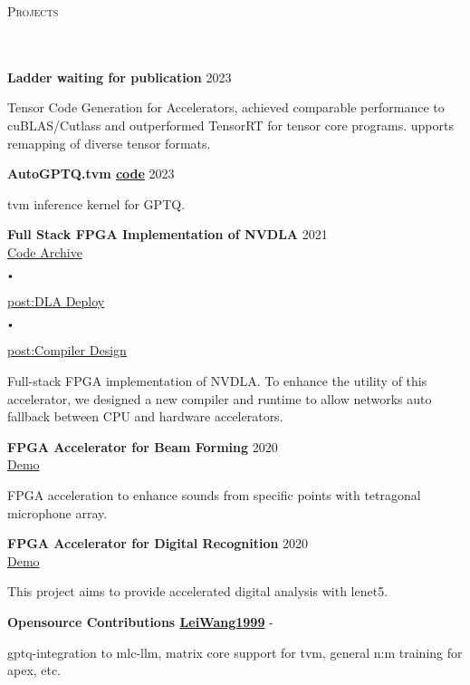\documentclass{article}
\newcommand{\header}[1]{{
\hspace*{-15pt}\vspace*{6pt} \textsc{#1}} \vspace*{-6pt} 
\lineunder
}
\newcommand{\lineunder}{
\vspace*{-8pt} \\ \hspace*{-18pt} 
\hrulefill \\
}
\newcommand{\project}[3]{{
\vspace*{2pt}%
\textbf{#1} \hfill #2\\ #3 \vspace*{2pt}}
}
\renewcommand{\labelitemi}{
$\vcenter{\hbox{\tiny$\bullet$}}$\hspace*{3pt}
}
\renewcommand{\labelitemii}{
$\vcenter{\hbox{\tiny$\bullet$}}$\hspace*{-3pt}
}
\newcommand{\myhref}[2]{%
\href{#1}{\textcolor{ColorTwo}{#2}}
}
\newenvironment{bullet-list-minor}{
\begin{list}{\labelitemii}{\setlength\leftmargin{15pt} 
\topsep 0pt \itemsep -2pt}}{\vspace*{4pt}\end{list}
}
\begin{document}
\vspace*{4pt}%
\header{Projects}
    \project{Ladder \textcolor{ColorOne}
{waiting for publication}}{2023}{}
    \begin{bullet-list-minor}
	\item Tensor Code Generation for Accelerators, achieved comparable performance to cuBLAS/Cutlass and outperformed TensorRT for tensor core programs. upports remapping of diverse tensor formats.
    \end{bullet-list-minor}
    \project{AutoGPTQ.tvm     \textcolor{ColorTwo}{\faGithub} 
\myhref{https://github.com/LeiWang1999/AutoGPTQ.tvm}{code}}{2023}{}
    \begin{bullet-list-minor}
	\item tvm inference kernel for GPTQ.
    \end{bullet-list-minor}
    \project{Full Stack FPGA Implementation of NVDLA}{2021}{
    \textcolor{ColorTwo}{\faGithub} 
\myhref{https://github.com/LeiWang1999/ZYNQ-NVDLA}{Code Archive}
    \labelitemi
    \textcolor{ColorTwo}{\faBook} 
\myhref{https://zhuanlan.zhihu.com/p/378202360}{post:DLA Deploy}
    \labelitemi
        \textcolor{ColorTwo}{\faBook} 
    \myhref{https://zhuanlan.zhihu.com/p/401943271}{post:Compiler Design}
}
	\begin{bullet-list-minor}
	\item Full-stack FPGA implementation of NVDLA. To enhance the utility of this accelerator, we designed a new compiler and runtime to allow networks auto fallback between CPU and hardware
                accelerators.
    \end{bullet-list-minor}
    \project{FPGA Accelerator for Beam Forming}{2020}{
    \textcolor{ColorTwo}{\faVideoCamera} 
    \myhref{https://github.com/LeiWang1999}{Demo}
}
	\begin{bullet-list-minor}
	\item FPGA acceleration to enhance sounds from specific points with tetragonal microphone array.
    \end{bullet-list-minor}
    \project{FPGA Accelerator for Digital Recognition}{2020}{
    \textcolor{ColorTwo}{\faVideoCamera} 
    \myhref{https://github.com/LeiWang1999}{Demo}
}
	\begin{bullet-list-minor}
	\item This project aims to provide accelerated digital analysis with lenet5.
    \end{bullet-list-minor}
    \project{Opensource Contributions     \textcolor{ColorTwo}{\faGithub} 
    \myhref{https://github.com/LeiWang1999}{LeiWang1999}}{-}{
}
	\begin{bullet-list-minor}
	\item gptq-integration to mlc-llm, matrix core support for tvm, general n:m training for apex, etc.
    \end{bullet-list-minor}
 
\end{document}
